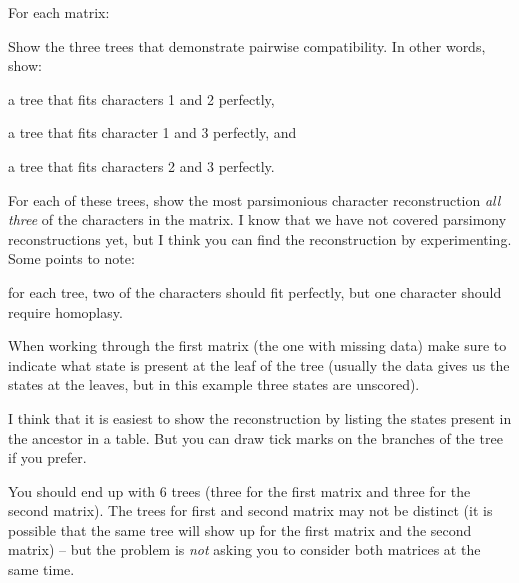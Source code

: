 \documentclass[11pt]{article}
\begin{document}
For each matrix:
\begin{compactenum}
	\item Show the three trees that demonstrate pairwise compatibility. In other words, show:
		\begin{compactenum}
			\item a tree that fits characters 1 and 2 perfectly,
			\item a tree that fits character 1 and 3 perfectly, and
			\item a tree that fits characters 2 and 3 perfectly.
		\end{compactenum}
	\item For each of these trees, show the most parsimonious character reconstruction {\em all three} of the characters in the matrix. I know that we have not covered parsimony reconstructions yet, but I think you can find the reconstruction by experimenting.  Some points to note:
		\begin{compactenum}
			\item for each tree, two of the characters should fit perfectly, but one character should require homoplasy.
			\item When working through the first matrix (the one with missing data) make sure to indicate what state is present at the leaf of the tree (usually the data gives us the states at the leaves, but in this example three states are unscored).
			\item I think that it is easiest to show the reconstruction by listing the states present in the ancestor in a table.  But you can draw tick marks on the branches of the tree if you prefer.
		\end{compactenum}
	\item You should end up with 6 trees (three for the first matrix and three for the second matrix).  The trees for first and second matrix may not be distinct (it is possible that the same tree will show up for the first matrix and the second matrix) -- but the problem is {\em not} asking you to consider both matrices at the same time.  
\end{compactenum}
\end{document}
